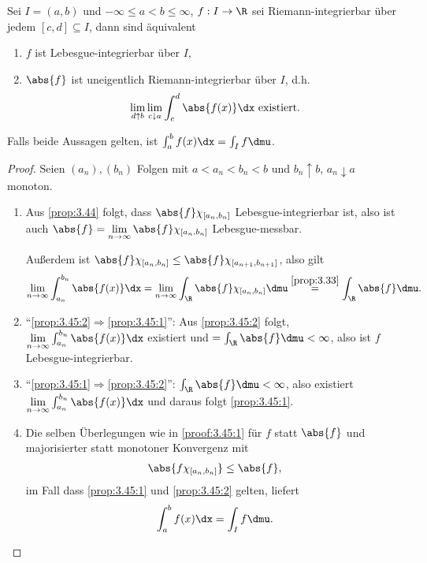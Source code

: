 \begin{prop}
\label{prop:3.45}
Sei $I=(a,b)$ und $-\infty\le a<b\le\infty$, $f: I\to\R$ sei
Riemann-integrierbar über jedem $[c,d]\subseteq I$, dann sind äquivalent
\begin{enumerate}[label=(\roman{*})]
  \item\label{prop:3.45:1} $f$ ist Lebesgue-integrierbar über $I$,
  \item\label{prop:3.45:2} $\abs{f}$ ist uneigentlich Riemann-integrierbar über
  $I$, d.h.
  \begin{align*}
  \lim_{d\uparrow b} \lim_{c\downarrow a} \int_c^d \abs{f(x)}\dx \text{
  existiert}.
  \end{align*}
\end{enumerate}
Falls beide Aussagen gelten, ist $\int_a^b f(x)\dx = \int_I f\dmu$.\fishhere 
\end{prop}
\begin{proof}
Seien $(a_n),(b_n)$ Folgen mit $a<a_n<b_n<b$ und $b_n\uparrow b$,
$a_n\downarrow a$ monoton.
\begin{enumerate}[label=\arabic{*}.)]
  \item\label{proof:3.45:1}  Aus \ref{prop:3.44}
  folgt, dass $\abs{f}\chi_{[a_n,b_n]}$ Lebesgue-integrierbar ist, also ist
  auch $\abs{f} = \lim\limits_{n\to\infty} \abs{f}\chi_{[a_n,b_n]}$ Lebesgue-messbar.
  
  Außerdem ist $\abs{f}\chi_{[a_n,b_n]}\le \abs{f}\chi_{[a_{n+1},b_{n+1}]}$,
  also gilt
\begin{align*}
\lim\limits_{n\to\infty} \int_{a_n}^{b_n} \abs{f(x)}\dx
= \lim\limits_{n\to\infty} \int_\R \abs{f}\chi_{[a_n,b_n]}\dmu
\overset{\ref{prop:3.33}}{=} \int_\R \abs{f}\dmu.  
\end{align*}
\item ``\ref{prop:3.45:2}$\Rightarrow$\ref{prop:3.45:1}'':
Aus \ref{prop:3.45:2} folgt, $\lim\limits_{n\to\infty} \int_{a_n}^{b_n}
\abs{f(x)}\dx$ existiert und $=\int_\R \abs{f}\dmu<\infty$, also ist $f$
Lebesgue-integrierbar.
\item ``\ref{prop:3.45:1}$\Rightarrow$\ref{prop:3.45:2}'': $\int_\R
\abs{f}\dmu<\infty$, also existiert $\lim\limits_{n\to\infty} \int_{a_n}^{b_n}
\abs{f(x)}\dx$ und daraus folgt \ref{prop:3.45:1}. 
\item Die selben Überlegungen wie in \ref{proof:3.45:1} für $f$ statt $\abs{f}$
und majorisierter statt monotoner Konvergenz mit
\begin{align*}
\abs{f \chi_{[a_n,b_n]}} \le \abs{f},
\end{align*}
im Fall dass \ref{prop:3.45:1} und \ref{prop:3.45:2} gelten, liefert
\begin{align*}
\int_a^b f(x)\dx =\int_I f\dmu.\qedhere 
\end{align*}
\end{enumerate}
\end{proof}

